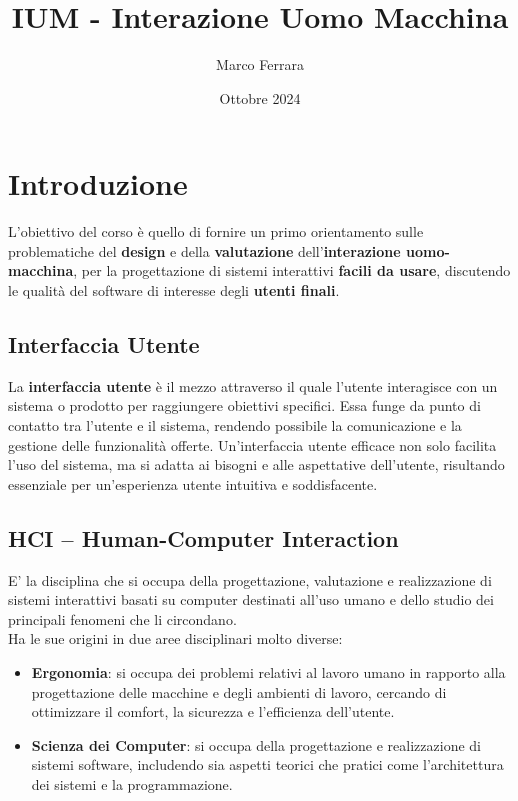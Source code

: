 \documentclass{report}
\title{IUM - Interazione Uomo Macchina}
\author{Marco Ferrara}
\date{Ottobre 2024}
\begin{document}
	\maketitle
	\tableofcontents
	\newpage
	
	\chapter{Introduzione}
	L'obiettivo del corso è quello di fornire un primo orientamento sulle problematiche del \textbf{design} e della \textbf{valutazione} dell'\textbf{interazione uomo-macchina}, per la progettazione di sistemi interattivi \textbf{facili da usare}, discutendo le qualità del software di interesse degli \textbf{utenti finali}.

	\section{Interfaccia Utente}
	La \textbf{interfaccia utente} è il mezzo attraverso il quale l'utente interagisce con un sistema o prodotto per raggiungere obiettivi specifici. Essa funge da punto di contatto tra l'utente e il sistema, rendendo possibile la comunicazione e la gestione delle funzionalità offerte. Un'interfaccia utente efficace non solo facilita l'uso del sistema, ma si adatta ai bisogni e alle aspettative dell'utente, risultando essenziale per un'esperienza utente intuitiva e soddisfacente.

	\section{HCI – Human-Computer Interaction}
	E' la disciplina che si occupa della progettazione, valutazione e realizzazione di sistemi interattivi basati su computer destinati all'uso umano e dello studio dei principali fenomeni che li circondano.
	\vspace{\baselineskip} \\
	Ha le sue origini in due aree disciplinari molto diverse:
	\begin{itemize}
		\item \textbf{Ergonomia}: si occupa dei problemi relativi al lavoro umano in rapporto alla progettazione delle macchine e degli ambienti di lavoro, cercando di ottimizzare il comfort, la sicurezza e l'efficienza dell'utente.

		\item \textbf{Scienza dei Computer}: si occupa della progettazione e realizzazione di sistemi software, includendo sia aspetti teorici che pratici come l'architettura dei sistemi e la programmazione.
	\end{itemize}
\end{document}
